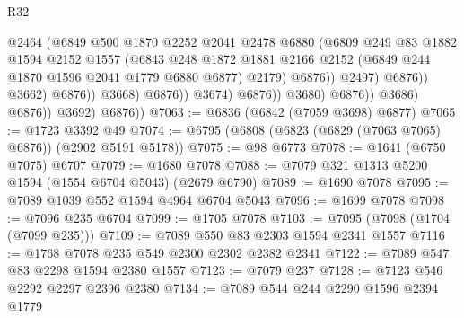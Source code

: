 \begin{lexlean}{R32}
\begin{coremodule}
                                              @2464
                                              (@6849
                                                @500
                                                @1870
                                                @2252
                                                @2041
                                                @2478
                                                @6880
                                                (@6809
                                                  @249
                                                  @83
                                                  @1882
                                                  @1594
                                                  @2152
                                                  @1557
                                                  (@6843
                                                    @248
                                                    @1872
                                                    @1881
                                                    @2166
                                                    @2152
                                                    (@6849 @244 @1870 @1596 @2041 @1779 @6880 @6877)
                                                    @2179)
                                                  @6876))
                                              @2497)
                                            @6876))
                                        @3662)
                                      @6876))
                                  @3668)
                                @6876))
                            @3674)
                          @6876))
                      @3680)
                    @6876))
                @3686)
              @6876))
          @3692)
        @6876))
@7063 := @6836 (@6842 (@7059 @3698) @6877)
@7065 := @1723 @3392 @49
@7074 := @6795 (@6808 (@6823 (@6829 (@7063 @7065) @6876)) (@2902 @5191 @5178))
@7075 := @98 @6773
@7078 := @1641 (@6750 @7075) @6707
@7079 := @1680 @7078
@7088 := @7079 @321 @1313 @5200 @1594 (@1554 @6704 @5043) (@2679 @6790)
@7089 := @1690 @7078
@7095 := @7089 @1039 @552 @1594 @4964 @6704 @5043
@7096 := @1699 @7078
@7098 := @7096 @235 @6704
@7099 := @1705 @7078
@7103 := @7095 (@7098 (@1704 (@7099 @235)))
@7109 := @7089 @550 @83 @2303 @1594 @2341 @1557
@7116 := @1768 @7078 @235 @549 @2300 @2302 @2382 @2341
@7122 := @7089 @547 @83 @2298 @1594 @2380 @1557
@7123 := @7079 @237
@7128 := @7123 @546 @2292 @2297 @2396 @2380
@7134 := @7089 @544 @244 @2290 @1596 @2394 @1779

\end{coremodule}
\end{lexlean}
